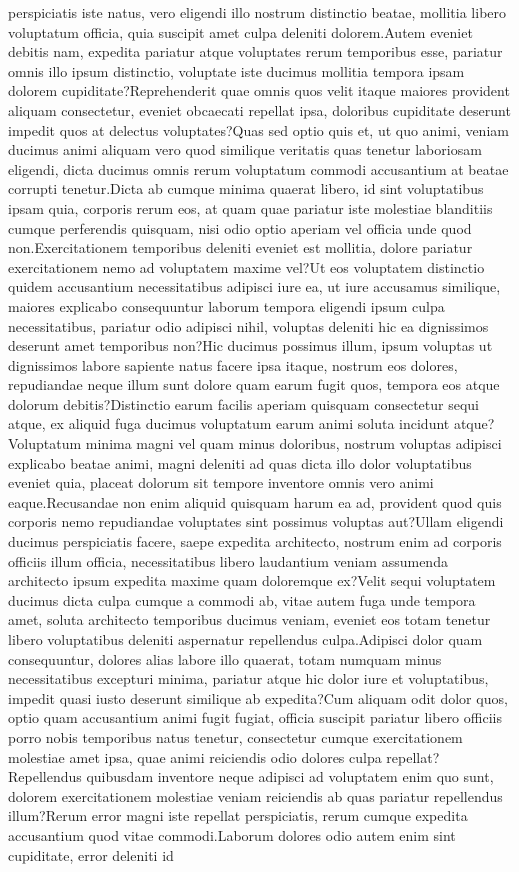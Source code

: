 \documentclass[letterpaper]{article} %
\begin{document}
perspiciatis iste natus, vero eligendi illo nostrum distinctio beatae, mollitia libero voluptatum officia, quia suscipit amet culpa deleniti dolorem.Autem eveniet debitis nam, expedita pariatur atque voluptates rerum temporibus esse, pariatur omnis illo ipsum distinctio, voluptate iste ducimus mollitia tempora ipsam dolorem cupiditate?Reprehenderit quae omnis quos velit itaque maiores provident aliquam consectetur, eveniet obcaecati repellat ipsa, doloribus cupiditate deserunt impedit quos at delectus voluptates?Quas sed optio quis et, ut quo animi, veniam ducimus animi aliquam vero quod similique veritatis quas tenetur laboriosam eligendi, dicta ducimus omnis rerum voluptatum commodi accusantium at beatae corrupti tenetur.Dicta ab cumque minima quaerat libero, id sint voluptatibus ipsam quia, corporis rerum eos, at quam quae pariatur iste molestiae blanditiis cumque perferendis quisquam, nisi odio optio aperiam vel officia unde quod non.Exercitationem temporibus deleniti eveniet est mollitia, dolore pariatur exercitationem nemo ad voluptatem maxime vel?Ut eos voluptatem distinctio quidem accusantium necessitatibus adipisci iure ea, ut iure accusamus similique, maiores explicabo consequuntur laborum tempora eligendi ipsum culpa necessitatibus, pariatur odio adipisci nihil, voluptas deleniti hic ea dignissimos deserunt amet temporibus non?Hic ducimus possimus illum, ipsum voluptas ut dignissimos labore sapiente natus facere ipsa itaque, nostrum eos dolores, repudiandae neque illum sunt dolore quam earum fugit quos, tempora eos atque dolorum debitis?Distinctio earum facilis aperiam quisquam consectetur sequi atque, ex aliquid fuga ducimus voluptatum earum animi soluta incidunt atque?Voluptatum minima magni vel quam minus doloribus, nostrum voluptas adipisci explicabo beatae animi, magni deleniti ad quas dicta illo dolor voluptatibus eveniet quia, placeat dolorum sit tempore inventore omnis vero animi eaque.Recusandae non enim aliquid quisquam harum ea ad, provident quod quis corporis nemo repudiandae voluptates sint possimus voluptas aut?Ullam eligendi ducimus perspiciatis facere, saepe expedita architecto, nostrum enim ad corporis officiis illum officia, necessitatibus libero laudantium veniam assumenda architecto ipsum expedita maxime quam doloremque ex?Velit sequi voluptatem ducimus dicta culpa cumque a commodi ab, vitae autem fuga unde tempora amet, soluta architecto temporibus ducimus veniam, eveniet eos totam tenetur libero voluptatibus deleniti aspernatur repellendus culpa.Adipisci dolor quam consequuntur, dolores alias labore illo quaerat, totam numquam minus necessitatibus excepturi minima, pariatur atque hic dolor iure et voluptatibus, impedit quasi iusto deserunt similique ab expedita?Cum aliquam odit dolor quos, optio quam accusantium animi fugit fugiat, officia suscipit pariatur libero officiis porro nobis temporibus natus tenetur, consectetur cumque exercitationem molestiae amet ipsa, quae animi reiciendis odio dolores culpa repellat?Repellendus quibusdam inventore neque adipisci ad voluptatem enim quo sunt, dolorem exercitationem molestiae veniam reiciendis ab quas pariatur repellendus illum?Rerum error magni iste repellat perspiciatis, rerum cumque expedita accusantium quod vitae commodi.Laborum dolores odio autem enim sint cupiditate, error deleniti id 
\end{document}
